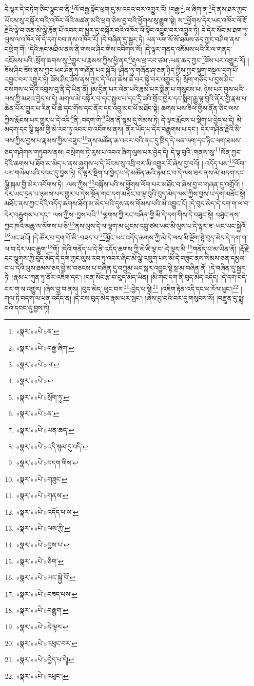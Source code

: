 དེ་ལྟར་དེ་བཏེག་ཅིང་ལྷུང་བ་ནི་\footnote{«སྣར་»«པེ་»ན་}ལོ་བརྒྱ་སྟོང་ཕྲག་དུ་མ་འདའ་བར་འགྱུར་རོ། །བརྒྱ་\footnote{«སྣར་»«པེ་»བརྒྱ་ཞིག་}:ལ་ཞིག་ན་\footnote{«སྣར་»«པེ་»ལ་}དེ་ནས་ཐར་ཀྱང་ཡོངས་སུ་བསྐོར་བའི་འཁོར་ལོའི་མཚན་མའི་ཕྲག་ཅེས་བྱ་བའི་ཕྱོགས་སུ་རྒྱུག་སྟེ། ས་\footnote{«སྣར་»«པེ་»}ཕྱོགས་དེར་ཡང་འཁོར་ལོ་རྡོ་རྗེའི་ལྟེ་བ་ཅན་མེ་ལྕེ་རྣོན་པོ་འབར་བ་མྱུར་དུ་བསྐོར་བའི་འཁོར་ལོ་སྟོང་འབྱུང་བར་འགྱུར་ཏེ། དེ་དེར་སོང་མ་ཐག་ཏུ་ལུས་ལ་འཁོར་ལོ་དེ་དག་བབ་ནས་འཁོར་རོ། །དེ་བཞིན་དུ་སྦྱར་ཏེ། ཡན་ལག་སོ་སོ་ཐམས་ཅད་ཀྱང་བཤིག་ནས་བསྲེག་གོ། །དེའི་རྐང་མཐིལ་ནས་ནི་གསལ་ཤིང་གིས་འབིགས་སོ། །དེ་ལྟར་གནད་འཇོམས་པའི་རི་ལ་གནད་འཇོམས་པའི་:སྲོག་ཆགས་སུ་\footnote{«སྣར་»«པེ་»སྲོག་ཏུ་}གྱུར་པ་རྣམས་ཀྱིས་ཕྱི་ནང་\footnote{«སྣར་»«པེ་»ན་}རྡུལ་ཕྲ་རབ་ཙམ་:ཡན་ཆད་ཀྱང་\footnote{«སྣར་»«པེ་»ཡན་ཆད་}ཟོས་པར་འགྱུར་རོ། །ཟོས་ཤིང་ཟོས་ནས་ཀྱང་ཡང་ཤིན་ཏུ་གཞོན་པར་སྐྱེའོ། །ཤིན་ཏུ་གཞོན་ཤ་ཅན་ཉིད་ཀྱིས་ཀྱང་སྡུག་བསྔལ་དྲག་པོ་འབྱུང་བར་འགྱུར་ཏེ། ཟོས་ཤིང་ཟོས་ནས་ཀྱང་དེ་ལ་ཤ་ཆེས་ཆེ་བར་སྐྱེ་བར་འགྱུར་ཏེ། སྲོག་གཅོད་པ་བྱས་ཤིང་བསགས་པ་དེའི་འབྲས་བུ་ནི་དེ་ཡིན་ནོ། །མ་བྱིན་པར་ལེན་པའི་རྣམ་པར་སྨིན་པ་གསུངས་པ། ཉེས་པར་བྱས་པའི་ལས་ཀྱི་མཐའ་བྱེད་པ་དེ། མགལ་མེ་བསྐོར་བ་དང་སྤྲུལ་པ་དང་དྲི་ཟའི་གྲོང་ཁྱེར་དང་སྨིག་རྒྱུ་ལྟ་བུའི་ནོར་གྱི་རྣམ་པ་ཆེན་པོར་གྱུར་པ་རིན་པོ་ཆེ་དང་གོས་དང་ནོར་དང་འབྲུ་མང་པོ་མཐོང་སྟེ། ཆགས་པས་ཟིལ་གྱིས་ནོན་ཅིང་ལས་ཀྱིས་རྨོངས་པར་གྱུར་པ་དེ་འདི་\footnote{«སྣར་»«པེ་»འདི་སྙམ་དུ་འདི་}ནི་:བདག་གི་\footnote{«སྣར་»«པེ་»བདག་གིས་}ཡིན་ནོ་སྙམ་དུ་སེམས་ཏེ། དེ་ལྟར་རྨོངས་པ་སྡིག་པ་བྱེད་པ་དེ། མེ་མདག་དང་ལྕི་སྐམ་གྱི་མེ་རབ་ཏུ་འབར་བ་འབོགས་ནས། ནོར་ཡོད་པ་དེར་བརྒྱུགས་པ་དང་། དེར་གཤིན་རྗེའི་མི་ལས་ཀྱིས་བྱས་པ་རྣམས་ཀྱིས་བཟུང་\footnote{«སྣར་»«པེ་»གཟུང་}ནས་མཚོན་ཆ་འབར་བའི་ནང་དུ་ཁྲིད་དེ་ཡན་ལག་དང་ཉིང་ལག་ཐམས་ཅད་གཤེགས་གཏུབས་ནས། བསྲེགས་ཏེ་རུས་པ་འབའ་ཞིག་ལུས་པར་བྱེད་དེ། དེ་ལྟ་བུའི་:གནས་སུ་\footnote{«སྣར་»«པེ་»གནས་}སོན་ཀྱང་དེའི་ཆགས་པ་ཐོག་མ་མེད་པ་ནས་ཞུགས་པ་དེ་ཡོངས་སུ་འབྲི་བར་མི་འགྱུར་རོ་ཞེས་བྱ་བའོ། །:འདོད་པས་\footnote{«སྣར་»«པེ་»འདོད་པ་ལ་}ལོག་པར་གཡེམ་པའི་དབང་དུ་བྱས་ཏེ། དེ་ལྟར་སྡིག་པ་བྱེད་པ་དེ་མཚོན་ཆའི་ཉམ་ང་བ་དེ་ལས་ཐར་ནས་མེ་མདག་དང་ལྕི་སྐམ་གྱི་མེར་འབོགས་ཏེ། :ལས་ཀྱིས་\footnote{«སྣར་»«པེ་»ལས་ཀྱི་}བསྐོས་པའི་ས་ཕྱོགས་ལོག་པར་མཐོང་བ་ཞེས་བྱ་བ་གཞན་དུ་འགྲོའོ། །དེར་ཡང་དྲན་པ་ཉམས་པར་གྱུར་པ་དེས་སྔོན་གང་དག་མཐོང་བ་ལྟ་བུའི་བུད་མེད་ལས་ཀྱིས་བྱས་པ་དག་མཐོང་སྟེ། མཐོང་ནས་ཀྱང་དེའི་འདོད་ཆགས་ཐོག་མ་མེད་པའི་དུས་ནས་གོམས་པའི་མེ་འབྱུང་ངོ། །དེ་བུད་མེད་དེ་དག་ག་ལ་བ་དེར་བརྒྱུགས་པ་དང་། ལས་ཀྱིས་:བྱས་པའི་\footnote{«སྣར་»«པེ་»བྱས་པ་}ལྕགས་ཀྱི་རང་བཞིན་གྱི་མི་དེ་དག་གིས་དེ་བཟུང་སྟེ། བཟུང་ནས་ཀྱང་ཁའི་མཆུ་ལ་སོགས་པ་ཅི་\footnote{«སྣར་»«པེ་»ཅིག་}ནས་ལུས་དེ་ལ་ལྷག་མ་ཡུངས་འབྲུ་ཙམ་ཡང་མི་ལུས་པ་དེ་ལྟར་ཟ་:ཡང་ཡང་སྐྱེའོ་\footnote{«སྣར་»«པེ་»ཡང་སྐྱེ་བོ་}ཡང་ཟའོ། །དེ་ཚོར་བ་དྲག་པོ་མི་:བཟད་པ་\footnote{«སྣར་»«པེ་»བཟད་པས་}མྱོང་ཡང་འདོད་ཆགས་ཀྱི་མེ་དེ་ལས་མི་ལྡོག་སྟེ་བུད་མེད་དེ་དག་ག་ལ་བ་དེར་ཡང་རྒྱུག་\footnote{«སྣར་»«པེ་»བརྒྱུག་}གོ། །དེའི་གནོད་པ་དེ་ནི་འདོད་ཆགས་ཀྱི་མེ་ཇི་ལྟ་བ་:དེ་ལྟར་མི་\footnote{«སྣར་»«པེ་»དེ་ལྟར་}གནོད་པ་མ་ཡིན་ནོ། །རྡོ་རྗེ་དང་ལྕགས་ཀྱི་བུད་མེད་དེ་དག་ཀྱང་ལུས་རབ་ཏུ་འབར་ཞིང་མེ་ལྕེ་འཁྲུག་པས་མི་དེ་བཟུང་ནས་སེམས་ཅན་དམྱལ་བ་པ་དེའི་ལུས་ཐམས་ཅད་བྱེ་མ་བཅངས་པ་བཞིན་དུ་བཀྲུམ་ཡང་སླར་འབྱུང་སྟེ་སྔ་མ་བཞིན་ནོ། །དེ་བཞིན་དུ་སྦྱར་ཏེ། །རྣམ་པ་ཀུན་ཏུ་ནོར་འཇིག་དང་། །ངན་སོང་རྩ་བ་བུད་མེད་ཡིན། །མི་གང་དག་ནི་བུད་མེད་འདོད། །དེ་དག་བདེ་བར་ག་ལ་འགྱུར། །ཞེས་བྱ་བ་ནས། །བུད་མེད་:ཕུང་བར་\footnote{«སྣར་»«པེ་»འཕུང་བར་}:བྱེད་པ་སྟེ།\footnote{«སྣར་»«པེ་»བྱེད་པ་དེ།} །འཇིག་རྟེན་འདི་དང་ཕ་རོལ་ཕུང་།\footnote{«སྣར་»«པེ་»འཕུང་།} །གལ་ཏེ་བདག་ལ་ཕན་འདོད་ན། །དེ་བས་བུད་མེད་རྣམ་པར་སྤང་། །ཞེས་བྱ་བའི་བར་དུ་གསུངས་སོ། །བརྫུན་དུ་སྨྲ་བའི་དབང་དུ་བྱས་ཏེ། 
